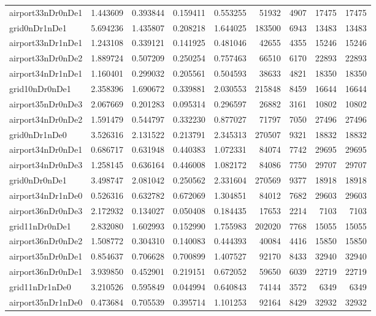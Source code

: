 \begin{longtable}{|l|r|r|r|r|r|r|r|r|}
airport33nDr0nDe1 & 1.443609 & 0.393844 & 0.159411 & 0.553255 & 51932 & 4907 & 17475 & 17475 \\
grid0nDr1nDe1 & 5.694236 & 1.435807 & 0.208218 & 1.644025 & 183500 & 6943 & 13483 & 13483 \\
airport33nDr1nDe1 & 1.243108 & 0.339121 & 0.141925 & 0.481046 & 42655 & 4355 & 15246 & 15246 \\
airport33nDr0nDe2 & 1.889724 & 0.507209 & 0.250254 & 0.757463 & 66510 & 6170 & 22893 & 22893 \\
airport34nDr1nDe1 & 1.160401 & 0.299032 & 0.205561 & 0.504593 & 38633 & 4821 & 18350 & 18350 \\
grid10nDr0nDe1 & 2.358396 & 1.690672 & 0.339881 & 2.030553 & 215848 & 8459 & 16644 & 16644 \\
airport35nDr0nDe3 & 2.067669 & 0.201283 & 0.095314 & 0.296597 & 26882 & 3161 & 10802 & 10802 \\
airport34nDr0nDe2 & 1.591479 & 0.544797 & 0.332230 & 0.877027 & 71797 & 7050 & 27496 & 27496 \\
grid0nDr1nDe0 & 3.526316 & 2.131522 & 0.213791 & 2.345313 & 270507 & 9321 & 18832 & 18832 \\
airport34nDr0nDe1 & 0.686717 & 0.631948 & 0.440383 & 1.072331 & 84074 & 7742 & 29695 & 29695 \\
airport34nDr0nDe3 & 1.258145 & 0.636164 & 0.446008 & 1.082172 & 84086 & 7750 & 29707 & 29707 \\
grid0nDr0nDe1 & 3.498747 & 2.081042 & 0.250562 & 2.331604 & 270569 & 9377 & 18918 & 18918 \\
airport34nDr1nDe0 & 0.526316 & 0.632782 & 0.672069 & 1.304851 & 84012 & 7682 & 29603 & 29603 \\
airport36nDr0nDe3 & 2.172932 & 0.134027 & 0.050408 & 0.184435 & 17653 & 2214 & 7103 & 7103 \\
grid11nDr0nDe1 & 2.832080 & 1.602993 & 0.152990 & 1.755983 & 202020 & 7768 & 15055 & 15055 \\
airport36nDr0nDe2 & 1.508772 & 0.304310 & 0.140083 & 0.444393 & 40084 & 4416 & 15850 & 15850 \\
airport35nDr0nDe1 & 0.854637 & 0.706628 & 0.700899 & 1.407527 & 92170 & 8433 & 32940 & 32940 \\
airport36nDr0nDe1 & 3.939850 & 0.452901 & 0.219151 & 0.672052 & 59650 & 6039 & 22719 & 22719 \\
grid11nDr1nDe0 & 3.210526 & 0.595849 & 0.044994 & 0.640843 & 74144 & 3572 & 6349 & 6349 \\
airport35nDr1nDe0 & 0.473684 & 0.705539 & 0.395714 & 1.101253 & 92164 & 8429 & 32932 & 32932 \\

\end{longtable}
